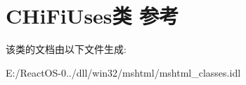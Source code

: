 \hypertarget{class_c_hi_fi_uses}{}\section{C\+Hi\+Fi\+Uses类 参考}
\label{class_c_hi_fi_uses}


该类的文档由以下文件生成\+:\begin{DoxyCompactItemize}
\item 
E\+:/\+React\+O\+S-\/0../dll/win32/mshtml/mshtml\+\_\+classes.\+idl\end{DoxyCompactItemize}
